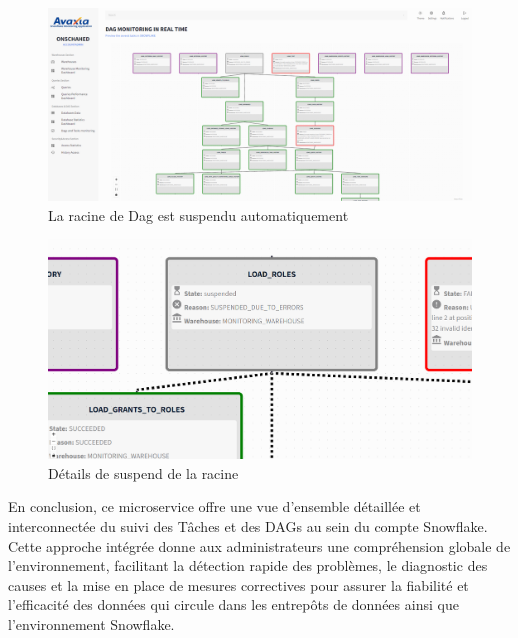 \begin{figure}[H]
    \centering
    \includegraphics[width =1\linewidth]{img/captures/dag/final/auto_suspend_root.png}
    \caption{La racine de Dag est suspendu automatiquement}
    \label{fig:root}
\end{figure}
\begin{figure}[H]
    \centering
    \includegraphics[width =1\linewidth]{img/captures/dag/final/roles.png}
    \caption{Détails de suspend de la racine}
    \label{fig:roles}
\end{figure}
\par En conclusion, ce microservice offre une vue d'ensemble détaillée et interconnectée du suivi des Tâches et des DAGs au sein du compte Snowflake.
Cette approche intégrée donne aux administrateurs une compréhension globale de l'environnement, facilitant la détection rapide des problèmes, le diagnostic des causes et la mise en place de mesures correctives pour assurer la fiabilité et l'efficacité des données qui circule dans les entrepôts de données ainsi que l'environnement Snowflake.

